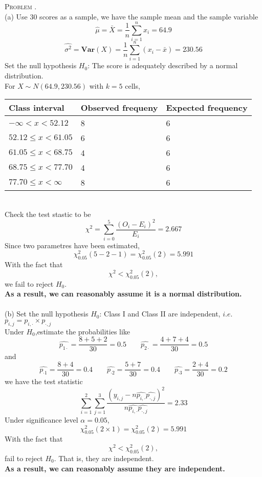 \documentclass[12pt, a4paper, oneside]{article}
\newcounter{problemname}
\newenvironment{problem}{\stepcounter{problemname}\par\noindent\textsc{Problem \arabic{problemname}. }}{\\\par}
\begin{document}
\begin{problem}
    \\
    (a) Use 30 scores as a sample, we have the sample mean and the sample variable 
    $$ \hat{\mu} = \bar{X} = \frac{1}{n}\sum_{i=1}^{n} x_i = 64.9$$
    $$ \hat{\sigma^2} = \mathbf{Var}(X) = \frac{1}{n}\sum_{i=1}^{n}(x_i-\bar{x}) = 230.56 $$
    Set the null hypothesis $H_0$: The score is adequately described by a normal distribution.\\
    For $X \sim N(64.9, 230.56)$ with $k = 5$ cells, \\
    \begin{table}[!h]
        \centering
        \begin{tabular}{|l|l|l|}
        \hline
            Class interval  & Observed frequeny & Expected frequency \\ \hline
            $-\infty  < x < 52.12$ & 8 & 6  \\ \hline
            $52.12 \leq x < 61.05$ & 6 & 6  \\ \hline
            $61.05 \leq x < 68.75$ & 4 & 6  \\ \hline
            $68.75 \leq x < 77.70$ & 4 & 6  \\ \hline
            $77.70 \leq x <\infty$ & 8 & 6  \\ \hline
        \end{tabular}
    \end{table}  
    \\
    Check the test stastic to be 
    $$\chi^2 = \sum_{i=0}^{5} \frac{(O_i-E_i)^2}{E_i} = 2.667$$  
    Since two parametres have been estimated,
    $$\chi^2_{0.05}(5-2-1)=\chi^2_{0.05}(2) = 5.991$$
    With the fact that $$\chi^2<\chi^2_{0.05}(2),$$
    we fail to reject $H_0$.\\
    \textbf{As a result, we can reasonably assume it is a normal distribution.}
    \\ \\ 
    (b) Set the null hypothesis $H_0$: Class I and Class II are independent, $i.e.$ 
    $p_{i,j} = p_{i,\cdot} \times p_{\cdot,j}$\\
    Under $H_0$,estimate the probabilities like
    $$\hat{p_{1\cdot}} = \frac{8+5+2}{30} = 0.5 \qquad \hat{p_{2\cdot}} = \frac{4+7+4}{30} = 0.5$$
    and $$\hat{p_{\cdot1}} = \frac{8+4}{30} = 0.4 \qquad \hat{p_{\cdot2}} = \frac{5+7}{30} = 0.4 \qquad 
          \hat{p_{\cdot3}} = \frac{2+4}{30} = 0.2$$
    we have the test statistic 
    $$ \sum_{i=1}^{2} \sum_{j=1}^{3} \frac{(y_{i,j} - n \hat{p_{i,\cdot}} \hat{p_{\cdot,j}})^2}
                                          {n \hat{p_{i,\cdot}} \hat{p_{\cdot,j}}}
                                    = 2.33$$
    Under significance level $\alpha = 0.05$,
    $$ \chi^2_{0.05}(2\times1)=\chi^2_{0.05}(2)  = 5.991$$
    With the fact that $$\chi^2 < \chi^2_{0.05}(2),$$
    fail to reject $H_0$. That is, they are independent.\\
    \textbf{As a result, we can reasonably assume they are independent.}\\
\end{problem}
\end{document}
